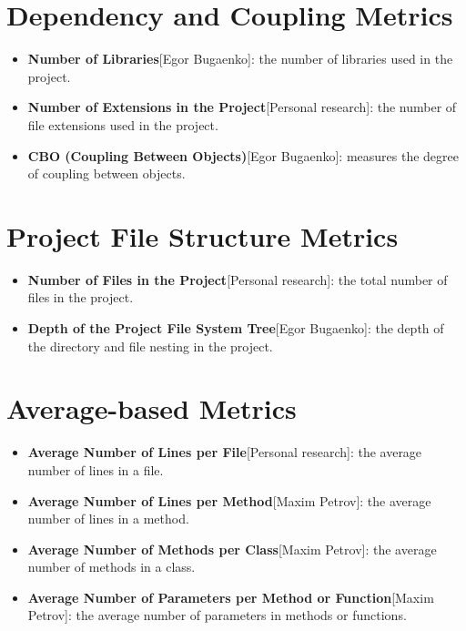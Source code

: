 \documentclass{article}
\begin{document}
\section{Dependency and Coupling Metrics}

\begin{itemize}
    \item \textbf{Number of Libraries}[Egor Bugaenko]: the number of libraries used in the project.
    \item \textbf{Number of Extensions in the Project}[Personal research]: the number of file extensions used in the project.
    \item \textbf{CBO (Coupling Between Objects)}[Egor Bugaenko]: measures the degree of coupling between objects.
\end{itemize}

\section{Project File Structure Metrics}

\begin{itemize}
    \item \textbf{Number of Files in the Project}[Personal research]: the total number of files in the project.
    \item \textbf{Depth of the Project File System Tree}[Egor Bugaenko]: the depth of the directory and file nesting in the project.
\end{itemize}

\section{Average-based Metrics}

\begin{itemize}
    \item \textbf{Average Number of Lines per File}[Personal research]: the average number of lines in a file.
    \item \textbf{Average Number of Lines per Method}[Maxim Petrov]: the average number of lines in a method.
    \item \textbf{Average Number of Methods per Class}[Maxim Petrov]: the average number of methods in a class.
    \item \textbf{Average Number of Parameters per Method or Function}[Maxim Petrov]: the average number of parameters in methods or functions.
\end{itemize}
\end{document}
